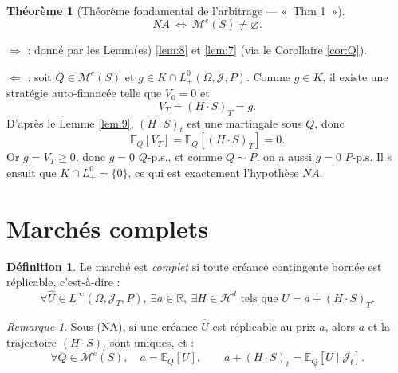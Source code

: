\documentclass[12pt,a4paper]{article}
\makeatletter
\numberwithin{equation}{section}
\theoremstyle{plain} %
\newtheorem{theoreme}{Théorème}              %
\theoremstyle{definition} %
\newtheorem{definition}{Définition}          %
\theoremstyle{remark} %
\newtheorem*{remarque}{Remarque}
\theoremstyle{myexample}
\theoremstyle{definition}
\renewenvironment{proof}[1][\proofname]{%
  \par\vspace{0.8em}%
  \pushQED{\qed}%
  \normalfont\color{cyan}%
  \topsep6\p@\@plus6\p@\relax
  \trivlist
  \item[\hskip\labelsep\bfseries\color{cyan}#1\@addpunct{.}]\ignorespaces
}{%
  \popQED\endtrivlist\vspace{0.8em}%
}
\newcommand{\E}{\mathbb{E}}
\newcommand{\RR}{\mathbb{R}}
\makeatother
\begin{document}
\begin{theoreme}[Théorème fondamental de l’arbitrage — «~Thm 1~»]
\[
NA\ \Longleftrightarrow\ \mathcal{M}^e(S)\neq\varnothing .
\]
\end{theoreme}

\begin{proof}
\emph{$\Rightarrow$} : donné par les Lemm(es) \ref{lem:8} et \ref{lem:7} (via le Corollaire \ref{cor:Q}).

\smallskip
\emph{$\Leftarrow$} : soit $Q\in\mathcal{M}^e(S)$ et $g\in K\cap L_+^0(\Omega,\mathcal{J},P)$.
Comme $g\in K$, il existe une stratégie auto-financée telle que $V_0=0$ et
\[
V_T=(H\cdot S)_T=g .
\]
D’après le Lemme \ref{lem:9}, $(H\cdot S)_t$ est une martingale sous $Q$, donc
\[
\E_Q[V_T]=\E_Q[(H\cdot S)_T]=0 .
\]
Or $g=V_T\ge0$, donc $g=0$ $Q$-p.s., et comme $Q\sim P$, on a aussi $g=0$ $P$-p.s.
Il s ensuit que $K\cap L_+^0=\{0\}$, ce qui est exactement l’hypothèse $NA$.
\end{proof}





\clearpage

\section{Marchés complets}

\begin{definition}
Le marché est \emph{complet} si toute créance contingente bornée est réplicable, c’est-à-dire :
\[
\forall \hat U \in L^\infty(\Omega,\mathcal{J}_T,P),\ \exists a\in\RR,\ \exists H\in\mathcal{H}^d
\text{ tels que } U = a + (H\cdot S)_T.
\]
\end{definition}

\begin{remarque}
Sous (NA), si une créance $\hat U$ est réplicable au prix $a$, alors $a$ et la trajectoire $(H\cdot S)_t$ sont uniques, et :
\[
\forall Q\in\mathcal{M}^e(S),\quad
a = \E_Q[U], \qquad a + (H\cdot S)_t = \E_Q[U \mid \mathcal{J}_t].
\]
\end{remarque}
\end{document}
